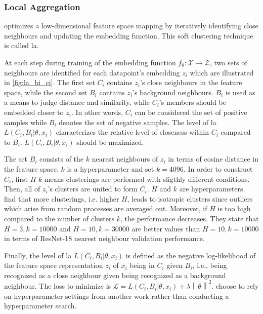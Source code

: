\subsubsection{Local Aggregation}\label{subsec:local_aggregation}


\citet{local_aggr_2019} optimizes a low-dimensional feature space mapping by 
iteratively identifying close neighbours and updating the embedding function.
This soft clustering technique is called \ac{la}.

At each step during training of the embedding function $f_\theta: \mathcal{X} \rightarrow \mathcal{Z}$, 
two sets of neighbours are identified for each datapoint's embedding $z_i$ 
which are illustrated in \autoref{fig:la_bi_ci}.
The first set $C_i$ contains $z_i$'s close neighbours in the feature space, while
the second set $B_i$ contains $z_i$'s background neighbours.
$B_i$ is used as a means to judge distance and similarity, 
while $C_i$'s members should be embedded closer to $z_i$.
In other words, $C_i$ can be considered the set of positive samples while 
$B_i$ denotes the set of negative samples.
The level of \ac{la} $L(C_i,B_i | \theta, x_i)$ 
characterizes the relative level of closeness within $C_i$ compared to $B_i$.
$L(C_i,B_i | \theta, x_i)$ should be maximized.

The set $B_i$ consists of the $k$ nearest neighbours of $z_i$ in terms of cosine distance 
in the feature space.
$k$ is a hyperparameter and \citet{local_aggr_2019} set $k=4096$.
In order to construct $C_i$, 
first $H$ $k$-means clusterings are performed with sligthly different conditions.
Then, all of $z_i$'s clusters are united to form $C_i$.
$H$ and $k$ are hyperparameters.
\citet{local_aggr_2019} find that more clusterings, i.e. higher $H$, leads to isotropic clusters since outliers which arise from random processes are averaged out.
Moreover, if $H$ is too high compared to the number of clusters $k$, the performance decreases.
They state that $H=3, k=10000$ and $H=10, k=30000$ are better values than $H=10, k=10000$ 
in terms of ResNet-18 nearest neighbour validation performance.

Finally, the level of \ac{la} $L(C_i,B_i | \theta, x_i)$ is defined as the negative log-likelihood 
of the feature space representation $z_i$ of $x_i$ being in $C_i$ given $B_i$, 
i.e., being recognized as a close neighbour given being recognized as a background neighbour.
The loss to minimize is $\mathcal{L} = L(C_i,B_i | \theta, x_i) + \lambda \left\| \theta \right\|^2$.
\citet{local_aggr_2019} choose to rely on hyperparameter settings from another work rather than conducting a hyperparameter search.

